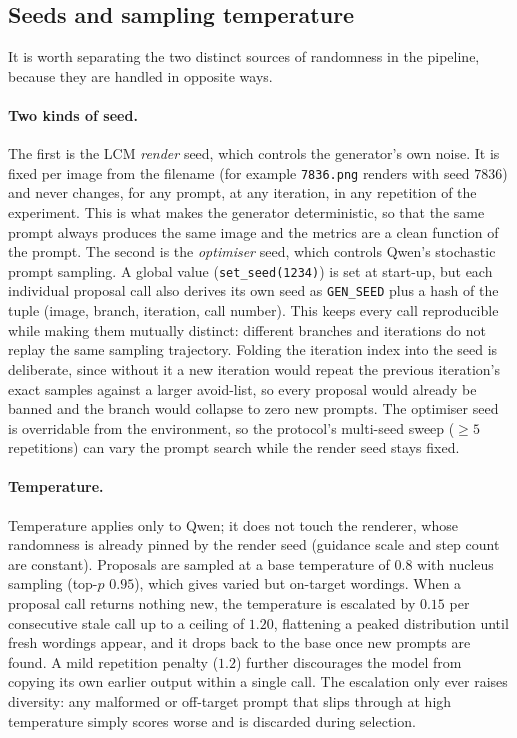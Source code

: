 \documentclass[runningheads]{llncs}
\begin{document}
\subsection{Seeds and sampling temperature}
It is worth separating the two distinct sources of randomness in the pipeline, because they are handled in opposite ways.

\paragraph{\normalfont\textbf{Two kinds of seed.}} The first is the LCM \emph{render} seed, which controls the generator's own noise. It is fixed per image from the filename (for example \texttt{7836.png} renders with seed $7836$) and never changes, for any prompt, at any iteration, in any repetition of the experiment. This is what makes the generator deterministic, so that the same prompt always produces the same image and the metrics are a clean function of the prompt. The second is the \emph{optimiser} seed, which controls Qwen's stochastic prompt sampling. A global value (\texttt{set\_seed(1234)}) is set at start-up, but each individual proposal call also derives its own seed as \texttt{GEN\_SEED} plus a hash of the tuple (image, branch, iteration, call number). This keeps every call reproducible while making them mutually distinct: different branches and iterations do not replay the same sampling trajectory. Folding the iteration index into the seed is deliberate, since without it a new iteration would repeat the previous iteration's exact samples against a larger avoid-list, so every proposal would already be banned and the branch would collapse to zero new prompts. The optimiser seed is overridable from the environment, so the protocol's multi-seed sweep ($\ge 5$ repetitions) can vary the prompt search while the render seed stays fixed.

\paragraph{\normalfont\textbf{Temperature.}} Temperature applies only to Qwen; it does not touch the renderer, whose randomness is already pinned by the render seed (guidance scale and step count are constant). Proposals are sampled at a base temperature of $0.8$ with nucleus sampling (top-$p$ $0.95$), which gives varied but on-target wordings. When a proposal call returns nothing new, the temperature is escalated by $0.15$ per consecutive stale call up to a ceiling of $1.20$, flattening a peaked distribution until fresh wordings appear, and it drops back to the base once new prompts are found. A mild repetition penalty ($1.2$) further discourages the model from copying its own earlier output within a single call. The escalation only ever raises diversity: any malformed or off-target prompt that slips through at high temperature simply scores worse and is discarded during selection.
\end{document}
